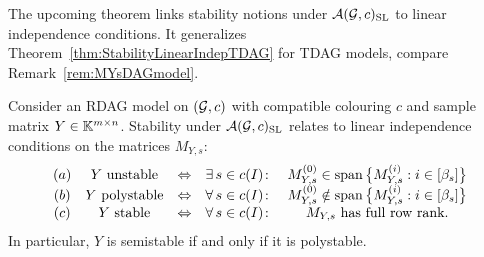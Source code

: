 The upcoming theorem links stability notions under $\mathcal{A}(\mathcal{G}, c)_{\operatorname{SL}}$ to linear independence conditions. It generalizes Theorem~\ref{thm:StabilityLinearIndepTDAG} for TDAG models, compare Remark~\ref{rem:MYsDAGmodel}.

\begin{theorem} \label{thm:RDAGStabilityVsLinDependence}
	Consider an RDAG model on $(\mathcal{G}, c)$ with compatible colouring $c$ and sample matrix $Y \in \mathbb K^{m \times n}$.
	Stability under $\mathcal{A}(\mathcal{G}, c)_{\operatorname{SL}}$ relates to linear independence conditions on the matrices $M_{Y,s}$:
	\[ \begin{matrix} (a) &  Y \text{ unstable}   & \Leftrightarrow & \exists \, s \in c(I) \colon & M_{Y,s}^{(0)} \in \operatorname{span} \big\lbrace M_{Y,s}^{(i)} : i \in [\beta_s] \big\rbrace  \\ 
		(b) & Y \text{ polystable} & \Leftrightarrow & \forall \, s \in c(I) \colon  &  M_{Y,s}^{(0)} \notin \operatorname{span}  \big\lbrace M_{Y,s}^{(i)} : i \in [\beta_s] \big\rbrace \\
		(c) & Y \text{ stable} &  \Leftrightarrow & \forall \, s \in c(I) \colon  &  M_{Y,s} \text{ has full row rank} . \end{matrix} \]
	In particular, $Y$ is semistable if and only if it is polystable.
\end{theorem} 

